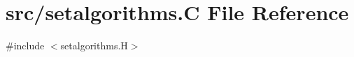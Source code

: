 \hypertarget{setalgorithms_8_c}{}\section{src/setalgorithms.C File Reference}
\label{setalgorithms_8_c}
{\ttfamily \#include $<$setalgorithms.\+H$>$}\newline
